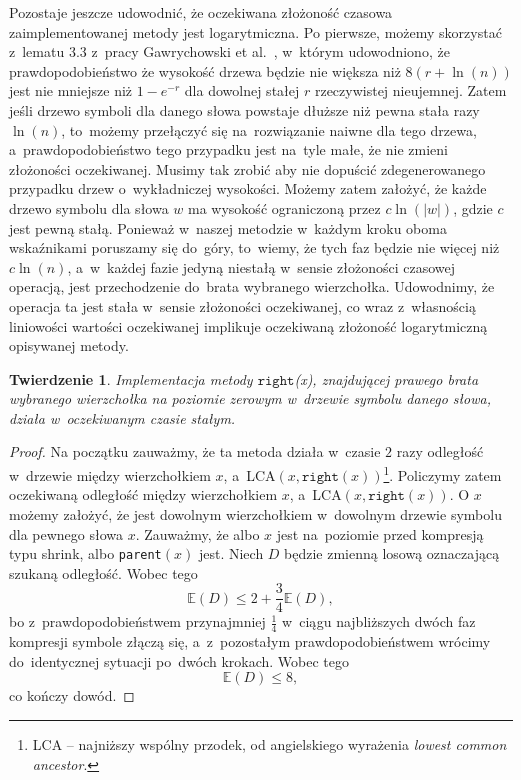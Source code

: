 \documentclass[declaration,shortabstract]{iithesis}
\theoremstyle{definition} \newtheorem{definition}{Definicja}[chapter]
\theoremstyle{plain} \newtheorem{remark}[definition]{Obserwacja}
\theoremstyle{plain} \newtheorem{theorem}[definition]{Twierdzenie}
\theoremstyle{plain} \newtheorem{example}{Przykład}[definition]
\theoremstyle{plain} \newtheorem{lemma}[definition]{Lemat}
\begin{document}
Pozostaje jeszcze udowodnić, że oczekiwana złożoność czasowa zaimplementowanej metody jest logarytmiczna. Po pierwsze, możemy skorzystać z~lematu 3.3 z~pracy Gawrychowski et al.~\cite{gawrychowski}, w~którym udowodniono, że prawdopodobieństwo że wysokość drzewa będzie nie większa niż $8(r + \ln (n))$ jest nie mniejsze niż $1 - e^{-r}$ dla dowolnej stałej $r$ rzeczywistej nieujemnej. Zatem jeśli drzewo symboli dla danego słowa powstaje dłuższe niż pewna stała razy $\ln (n)$, to~możemy przełączyć się na~rozwiązanie naiwne dla tego drzewa, a~prawdopodobieństwo tego przypadku jest na~tyle małe, że nie zmieni złożoności oczekiwanej. Musimy tak zrobić aby nie dopuścić zdegenerowanego przypadku drzew o~wykładniczej wysokości. Możemy zatem założyć, że każde drzewo symbolu dla słowa $w$ ma wysokość ograniczoną przez $c\ln(|w|)$, gdzie $c$ jest pewną stałą. Ponieważ w~naszej metodzie w~każdym kroku oboma wskaźnikami poruszamy się do~góry, to~wiemy, że tych faz będzie nie więcej niż $c \ln(n)$, a~w~każdej fazie jedyną niestałą w~sensie złożoności czasowej operacją, jest przechodzenie do~brata wybranego wierzchołka. Udowodnimy, że operacja ta jest stała w~sensie złożoności oczekiwanej, co wraz z~własnością liniowości wartości oczekiwanej implikuje oczekiwaną złożoność logarytmiczną opisywanej metody.

\begin{theorem}
    Implementacja metody $\texttt{right}$(x), znajdującej prawego brata wybranego wierzchołka na poziomie zerowym w~drzewie symbolu danego słowa, działa w~oczekiwanym czasie stałym.
\end{theorem}

\begin{proof}
    Na początku zauważmy, że ta metoda działa w~czasie $2$ razy odległość w~drzewie między wierzchołkiem $x$, a~LCA$(x, \texttt{right}(x))$\footnote{LCA -- najniższy wspólny przodek, od angielskiego wyrażenia \textit{lowest common ancestor}.}. Policzymy zatem oczekiwaną odległość między wierzchołkiem $x$, a~LCA$(x, \texttt{right}(x))$. O $x$ możemy założyć, że jest dowolnym wierzchołkiem w~dowolnym drzewie symbolu dla pewnego słowa $x$. Zauważmy, że albo $x$ jest na~poziomie przed kompresją typu shrink, albo \texttt{parent}$(x)$ jest. Niech $D$ będzie zmienną losową oznaczającą szukaną odległość. Wobec tego $$\mathbb{E} (D) \leq 2 + \frac{3}{4} \mathbb{E} (D),$$ bo z~prawdopodobieństwem przynajmniej $\frac{1}{4}$ w~ciągu najbliższych dwóch faz kompresji symbole złączą się, a~z~pozostałym prawdopodobieństwem wrócimy do~identycznej sytuacji po~dwóch krokach. Wobec tego $$\mathbb{E} (D) \leq 8,$$ co kończy dowód.
\end{proof}
\end{document}
